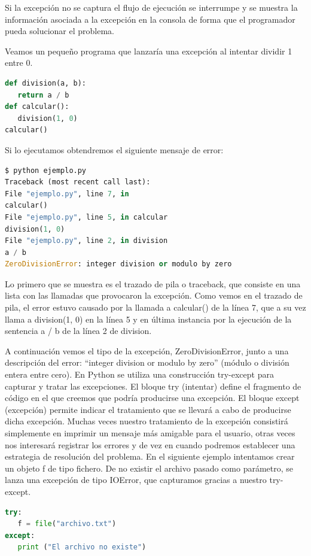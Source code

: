 \documentclass[12pt, twoside]{report}
\begin{document}
Si la excepción no se captura el flujo de ejecución se interrumpe y se muestra la información asociada a la excepción en la consola de forma que el programador pueda solucionar el problema.

Veamos un pequeño programa que lanzaría una excepción al intentar dividir 1 entre 0.


\begin{lstlisting}[language=Python]
def division(a, b):
   return a / b
def calcular():
   division(1, 0)
calcular()
\end{lstlisting}

Si lo ejecutamos obtendremos el siguiente mensaje de error:

\begin{lstlisting}[language=Python]
$ python ejemplo.py
Traceback (most recent call last):
File "ejemplo.py", line 7, in
calcular()
File "ejemplo.py", line 5, in calcular
division(1, 0)
File "ejemplo.py", line 2, in division
a / b
ZeroDivisionError: integer division or modulo by zero
\end{lstlisting}

Lo primero que se muestra es el trazado de pila o traceback, que consiste en una lista con las llamadas que provocaron la excepción. Como vemos en el trazado de pila, el error estuvo causado por la llamada a calcular() de la línea 7, que a su vez llama a division(1, 0) en la línea 5 y en última instancia por la ejecución de la sentencia a / b de la línea 2 de division.

A continuación vemos el tipo de la excepción, ZeroDivisionError, junto a una descripción del error: “integer division or modulo by zero” (módulo o división entera entre cero).
En Python se utiliza una construcción try-except para capturar y tratar las excepciones. El bloque try (intentar) define el fragmento de código en el que creemos que podría producirse una excepción. El bloque except (excepción) permite indicar el tratamiento que se llevará a cabo de producirse dicha excepción. Muchas veces nuestro tratamiento de la excepción consistirá simplemente en imprimir un mensaje más amigable para el usuario, otras veces nos interesará registrar los errores y de vez en cuando podremos establecer una estrategia de resolución del problema.
En el siguiente ejemplo intentamos crear un objeto f de tipo fichero. De no existir el archivo pasado como parámetro, se lanza una excepción de tipo IOError, que capturamos gracias a nuestro try-except.

\begin{lstlisting}[language=Python]
try:
   f = file("archivo.txt")
except:
   print ("El archivo no existe")
\end{lstlisting}
\end{document}
